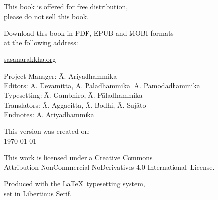 \cleartoverso
\thispagestyle{empty}

\vspace*{-\baselineskip}

{%

\fontsize{9}{11}\selectfont
\centering
\setlength{\parindent}{0pt}%
\setlength{\parskip}{0.8\baselineskip}%


This book is offered for free distribution,\\
please do not sell this book.

Download this book in PDF, EPUB and MOBI formats\\
at the following address:

\href{https://sasanarakkha.org/}{sasanarakkha.org}

\vfill

Project Manager: Ā. Ariyadhammika\\
Editors: Ā. Devamitta, Ā. Pāladhammika, Ā. Pamodadhammika\\
Typesetting: Ā. Gambhiro, Ā. Pāladhammika\\
Translators: Ā. Aggacitta, Ā. Bodhi, Ā. Sujāto\\
Endnotes: Ā. Ariyadhammika

\vfill

This version was created on:\\
\today\\
\currenttime

\vfill

This work is licensed under a Creative Commons\\
Attribution-NonCommercial-NoDerivatives 4.0 International~License.

Produced with the \LaTeX\ typesetting system,\\
set in Libertinus Serif.

\theEditionInfo

}
